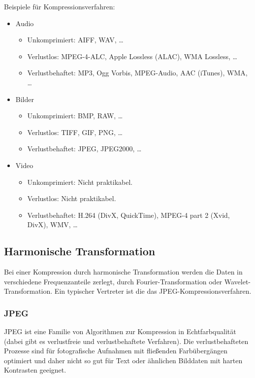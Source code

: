 		Beispiele für Kompressionsverfahren:
		\begin{itemize}
			\item Audio
				\begin{itemize}
					\item Unkomprimiert: AIFF, WAV, \dots
					\item Verlustlos: MPEG-4-ALC, Apple Lossless (ALAC), WMA Lossless, \dots
					\item Verlustbehaftet: MP3, Ogg Vorbis, MPEG-Audio, AAC (iTunes), WMA, \dots
				\end{itemize}
			\item Bilder
				\begin{itemize}
					\item Unkomprimiert: BMP, RAW, \dots
					\item Verlustlos: TIFF, GIF, PNG, \dots
					\item Verlustbehaftet: JPEG, JPEG2000, \dots
				\end{itemize}
			\item Video
				\begin{itemize}
					\item Unkomprimiert: Nicht praktikabel.
					\item Verlustlos: Nicht praktikabel.
					\item Verlustbehaftet: H.264 (DivX, QuickTime), MPEG-4 part 2 (Xvid, DivX), WMV, \dots
				\end{itemize}
		\end{itemize}

		\subsection{Harmonische Transformation}
			Bei einer Kompression durch harmonische Transformation werden die Daten in verschiedene Frequenzanteile zerlegt, \zB durch Fourier-Transformation oder Wavelet-Transformation. Ein typischer Vertreter ist die das JPEG-Kompressionsverfahren.

			\subsubsection{JPEG}
				JPEG ist eine Familie von Algorithmen zur Kompression in Echtfarbqualität (dabei gibt es verlustfreie und verlustbehaftete Verfahren). Die verlustbehafteten Prozesse sind für fotografische Aufnahmen mit fließenden Farbübergängen optimiert und daher nicht so gut für Text oder ähnlichen Bilddaten mit harten Kontrasten geeignet.

